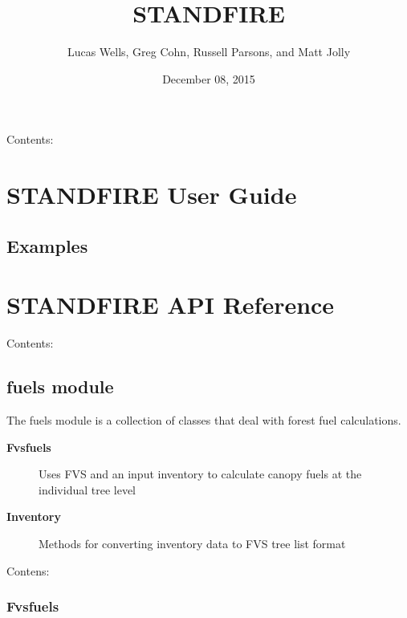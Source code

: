 \documentclass[letterpaper,10pt,english]{sphinxmanual}
\title{STANDFIRE}
\date{December 08, 2015}
\author{Lucas Wells, Greg Cohn, Russell Parsons, and Matt Jolly}
\begin{document}
\maketitle
\tableofcontents
{}\label{index::doc}


Contents:


\chapter{STANDFIRE User Guide}
\label{user_guide:standfire-user-guide}\label{user_guide::doc}\label{user_guide:welcome-to-standfire}

\section{Examples}
\label{user_guide:examples}

\chapter{STANDFIRE API Reference}
\label{api_ref:standfire-api-reference}\label{api_ref::doc}
Contents:


\section{fuels module}
\label{fuels:module-fuels}\label{fuels::doc}\label{fuels:fuels-module}
The fuels module is a collection of classes that deal with forest fuel
calculations.
\begin{description}
\item[{\textbf{Fvsfuels}}] \leavevmode
Uses FVS and an input inventory to calculate canopy fuels at the
individual tree level

\item[{\textbf{Inventory}}] \leavevmode
Methods for converting inventory data to FVS tree list format

\end{description}

Contens:


\subsection{Fvsfuels}
\label{Fvsfuels::doc}\label{Fvsfuels:fvsfuels}
\end{document}
